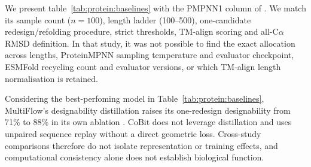 
We present table~\ref{tab:protein:baselines} with the PMPNN1 column of \citet{protein:simpledesign}. We match its sample count ($n=100$), length ladder (100--500), one-candidate redesign/refolding procedure, strict thresholds, TM-align scoring and all-C$\alpha$ RMSD definition. In that study, it was not possible to find the exact allocation across lengths, ProteinMPNN sampling temperature and evaluator checkpoint, ESMFold recycling count and evaluator versions, or which TM-align length normalisation is retained. 



Considering the best-perfoming model in Table~\ref{tab:protein:baselines}, MultiFlow's designability distillation raises its one-redesign designability from 71\% to 88\% in its own ablation \citep{campbell2024multiflow}. CoBit does not leverage distillation and uses unpaired sequence replay without a direct geometric loss. Cross-study comparisons therefore do not isolate representation or training effects, and computational consistency alone does not establish biological function.
\endgroup